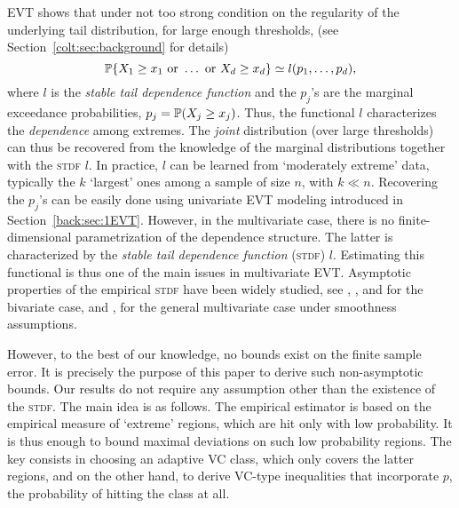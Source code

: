   \textsc{EVT} shows that under not too strong condition on the regularity of the underlying tail distribution, for large enough
  thresholds, (see Section~\ref{colt:sec:background} for details) 
\[
\P\{X_1 \ge x_1 \text{ or }  \dotsc \text{ or }
X_d\ge x_d \} \simeq 
l(p_1,\ldots,p_d), 
\]  
where $l$ is the  \emph{stable tail dependence function} and the
$p_j$'s  are the marginal exceedance probabilities, $p_j = \P(X_j\ge
x_j)$. Thus, the functional $l$  characterizes 
 the \emph{dependence} among extremes. The \emph{joint}   distribution
 (over large thresholds) 
 can thus be recovered from  the knowledge of the marginal distributions  together with
 the \textsc{stdf} $l$. In practice, $l$ can be learned %
 from
 `moderately extreme' data, typically the $k$   `largest' ones among a
 sample of size $n$, with $k\ll n$.
Recovering the $p_j$'s can be easily done using univariate \textsc{EVT} modeling introduced in Section~\ref{back:sec:1EVT}.
However, in the multivariate case, %
there is no finite-dimensional parametrization of the dependence
structure. 
The latter is characterized by %
the \emph{stable tail dependence function} (\textsc{stdf}) $l$.
 Estimating this functional is thus one of the main issues in multivariate \textsc{EVT}. Asymptotic properties of the empirical \textsc{stdf} have been widely studied, see \cite{Huangphd}, \cite{Drees98}, \cite{Embrechts2000} and \cite{dHF06} for the bivariate case, and \cite{Qi97}, \cite{Einmahl2012} for the general multivariate case under smoothness assumptions.

However, to the best of our knowledge, no bounds exist  %
on the finite sample error. It is precisely the purpose
of this paper to derive such non-asymptotic  bounds. Our results do
not require any assumption other than  the existence of the \textsc{stdf}.
The main idea is as follows. The empirical estimator is based on 
the empirical measure of `extreme' regions, which  are hit
 only with  low probability. It is thus enough to bound 
 maximal deviations on such low probability regions. The key consists
 in choosing an adaptive VC class, which only covers the
 latter regions, and on the other hand, to  derive  VC-type inequalities that incorporate $p$,
 the probability of hitting the class at all.%
 

